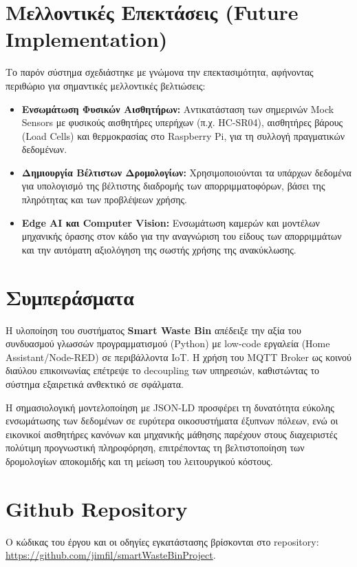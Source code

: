 \documentclass[acmsmall,screen,nonacm]{acmart}
\begin{document}
	\section{Μελλοντικές Επεκτάσεις (Future Implementation)}
	Το παρόν σύστημα σχεδιάστηκε με γνώμονα την επεκτασιμότητα, αφήνοντας περιθώριο για σημαντικές μελλοντικές βελτιώσεις:
	\begin{itemize}
		\item \textbf{Ενσωμάτωση Φυσικών Αισθητήρων:} Αντικατάσταση των σημερινών Mock Sensors με φυσικούς αισθητήρες υπερήχων (π.χ. HC-SR04), αισθητήρες βάρους (Load Cells) και θερμοκρασίας στο Raspberry Pi, για τη συλλογή πραγματικών δεδομένων.
		\item \textbf{Δημιουργία Βέλτιστων Δρομολογίων:} Χρησιμοποιούνται τα υπάρχων δεδομένα για υπολογισμό της βέλτιστης διαδρομής των απορριμματοφόρων, βάσει της πληρότητας και των προβλέψεων χρήσης.
		\item \textbf{Edge AI και Computer Vision:} Ενσωμάτωση καμερών και μοντέλων μηχανικής όρασης στον κάδο για την αναγνώριση του είδους των απορριμμάτων και την αυτόματη αξιολόγηση της σωστής χρήσης της ανακύκλωσης.
	\end{itemize}

	\section{Συμπεράσματα}
	Η υλοποίηση του συστήματος \textbf{Smart Waste Bin} απέδειξε την αξία του συνδυασμού γλωσσών προγραμματισμού (Python) με low-code εργαλεία (Home Assistant/Node-RED) σε περιβάλλοντα IoT. Η χρήση του MQTT Broker ως κοινού διαύλου επικοινωνίας επέτρεψε το decoupling των υπηρεσιών, καθιστώντας το σύστημα εξαιρετικά ανθεκτικό σε σφάλματα. 
	
	Η σημασιολογική μοντελοποίηση με JSON-LD προσφέρει τη δυνατότητα εύκολης ενσωμάτωσης των δεδομένων σε ευρύτερα οικοσυστήματα έξυπνων πόλεων, ενώ οι εικονικοί αισθητήρες κανόνων και μηχανικής μάθησης παρέχουν στους διαχειριστές πολύτιμη προγνωστική πληροφόρηση, επιτρέποντας τη βελτιστοποίηση των δρομολογίων αποκομιδής και τη μείωση του λειτουργικού κόστους.
	
	\section{Github Repository}
	Ο κώδικας του έργου και οι οδηγίες εγκατάστασης βρίσκονται στο repository: \\
	\url{https://github.com/jimfil/smartWasteBinProject}.
	
\end{document}
